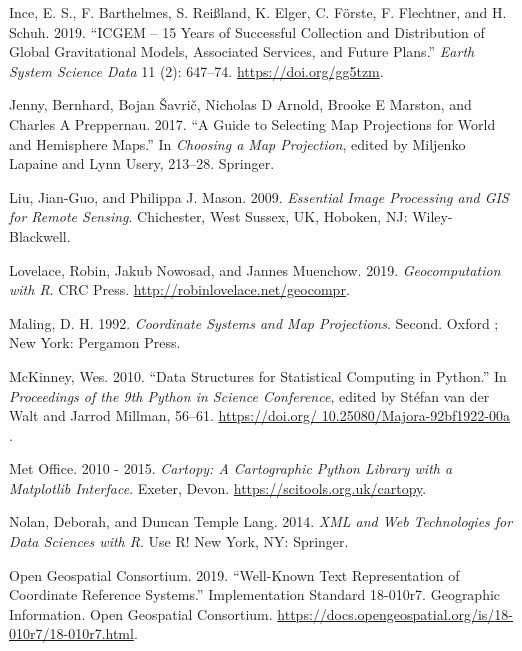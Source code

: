 \documentclass[
  letterpaper,
]{krantz}
\newlength{\cslhangindent}
\newenvironment{CSLReferences}[2] %
 {\begin{list}{}{%
  \setlength{\itemindent}{0pt}
  \setlength{\leftmargin}{0pt}
  \setlength{\parsep}{0pt}
  \ifodd #1
   \setlength{\leftmargin}{\cslhangindent}
   \setlength{\itemindent}{-1\cslhangindent}
  \fi
  \setlength{\itemsep}{#2\baselineskip}}}
 {\end{list}}
\begin{document}
\begin{CSLReferences}{1}{0}
Ince, E. S., F. Barthelmes, S. Reißland, K. Elger, C. Förste, F.
Flechtner, and H. Schuh. 2019. {``{ICGEM} -- 15 Years of Successful
Collection and Distribution of Global Gravitational Models, Associated
Services, and Future Plans.''} \emph{Earth System Science Data} 11 (2):
647--74. \url{https://doi.org/gg5tzm}.

Jenny, Bernhard, Bojan Šavrič, Nicholas D Arnold, Brooke E Marston, and
Charles A Preppernau. 2017. {``A Guide to Selecting Map Projections for
World and Hemisphere Maps.''} In \emph{Choosing a {Map Projection}},
edited by Miljenko Lapaine and Lynn Usery, 213--28. {Springer}.

Liu, Jian-Guo, and Philippa J. Mason. 2009. \emph{Essential Image
Processing and {GIS} for Remote Sensing}. {Chichester, West Sussex, UK,
Hoboken, NJ}: {Wiley-Blackwell}.

Lovelace, Robin, Jakub Nowosad, and Jannes Muenchow. 2019.
\emph{Geocomputation with {R}}. {CRC Press}.
\url{http://robinlovelace.net/geocompr}.

Maling, D. H. 1992. \emph{Coordinate Systems and Map Projections}.
Second. {Oxford ; New York}: {Pergamon Press}.

McKinney, Wes. 2010. {``{D}ata {S}tructures for {S}tatistical
{C}omputing in {P}ython.''} In \emph{{P}roceedings of the 9th {P}ython
in {S}cience {C}onference}, edited by Stéfan van der Walt and Jarrod
Millman, 56--61.
\href{https://doi.org/\%2010.25080/Majora-92bf1922-00a\%20}{https://doi.org/
10.25080/Majora-92bf1922-00a }.

Met Office. 2010 - 2015. \emph{Cartopy: A Cartographic Python Library
with a Matplotlib Interface}. Exeter, Devon.
\url{https://scitools.org.uk/cartopy}.

Nolan, Deborah, and Duncan Temple Lang. 2014. \emph{{XML} and Web
Technologies for Data Sciences with {R}}. Use {R}! {New York, NY}:
{Springer}.

Open Geospatial Consortium. 2019. {``Well-Known Text Representation of
Coordinate Reference Systems.''} Implementation Standard 18-010r7.
Geographic Information. {Open Geospatial Consortium}.
\url{https://docs.opengeospatial.org/is/18-010r7/18-010r7.html}.


\end{CSLReferences}
\end{document}
